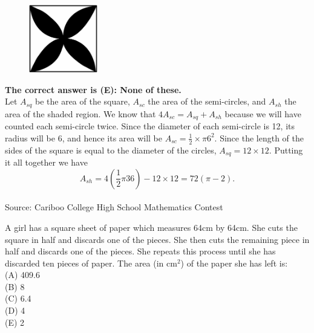 \documentclass{article}
\begin{document}
\begin{figure}
	\includegraphics[width=30mm,viewport=36 122 514 596]{CCJPR74-8pic.eps}
\end{figure}

\textbf{The correct answer is (E): None of these.}\\[1 ex]
Let $A_{sq}$ be the area of the square, $A_{sc}$ the area of the semi-circles, and $A_{sh}$ the area of the shaded region. We know that $4A_{sc}=A_{sq}+A_{sh}$ because we will have counted each semi-circle twice. Since the diameter of each semi-circle is 12, its radius will be 6, and hence its area will be $A_{sc}=\frac{1}{2}\times\pi6^2$. Since the length of the sides of the square is equal to the diameter of the circles, $A_{sq}=12\times12$. Putting it all together we have
\begin{equation*}
A_{sh}=4(\frac{1}{2}\pi36)-12\times12=72(\pi-2).
\end{equation*}
\\[5 ex]

\scriptsize
Source: Cariboo College High School Mathematics Contest

\normalsize
A girl has a square sheet of paper which measures 64cm by 64cm. She cuts the square in half and discards one of the pieces. She then cuts the remaining piece in half and discards one of the pieces. She repeats this process until she has discarded ten pieces of paper. The area (in cm$^{2}$) of the paper she has left is:\\
(A) 409.6\\
(B) 8\\
(C) 6.4\\
(D) 4\\
(E) 2\\
\end{document}
